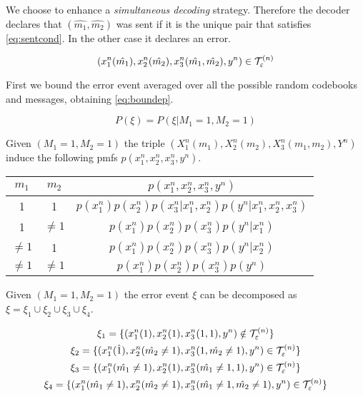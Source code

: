 We choose to enhance a \textit{simultaneous decoding} strategy. Therefore the decoder declares that $(\hat{m_1},\hat{m_2})$ was sent if it is the unique pair that satisfies \eqref{eq:sentcond}. In the other case it declares an error.

\begin{equation}
	(x_1^n(\hat{m_1}),x_2^n(\hat{m_2}), x_3^n(\hat{m_1}, \hat{m_2}), y^n) \in \mathcal{T}_\varepsilon^{(n)}{}
	\label{eq:sentcond}
\end{equation}

First we bound the error event averaged over all the possible random codebooks and messages, obtaining \eqref{eq:boundep}.

\begin{equation}
	P(\xi)=P(\xi | M_1=1,M_2=1)
	\label{eq:boundep}
\end{equation}

Given $(M_1=1,M_2=1)$ the triple $(X_1^n(m_1),X_2^n(m_2), X_3^n(m_1,m_2),Y^n)$ induce the following pmfs $p(x_1^n,x_2^n,x_3^n,y^n)$.

\begin{center}
    \begin{tabular}{ | c | c | c |}
    \hline
		$m_1$ & $m_2$ & $p(x_1^n,x_2^n,x_3^n,y^n)$ \\ \hline
		1 & 1 & $p(x_1^n)p(x_2^n)p(x_3^n|x_1^n,x_2^n)p(y^n|x_1^n,x_2^n,x_3^n)$ \\ \hline
    1 & $\neq 1$ & $p(x_1^n)p(x_2^n)p(x_3^n)p(y^n|x_1^n)$ \\ \hline
    $\neq 1$ & 1 & $p(x_1^n)p(x_2^n)p(x_3^n)p(y^n|x_2^n)$ \\ \hline
		$\neq 1$ & $\neq 1$ & $p(x_1^n)p(x_2^n)p(x_3^n)p(y^n)$ \\ \hline
    \end{tabular}
\end{center}

Given $(M_1=1,M_2=1)$ the error event $\xi$ can be decomposed as $\xi = \xi_1 \cup \xi_2 \cup \xi_3 \cup \xi_4$.

\begin{equation}
	\begin{gathered}
		\xi_1 = \{ (x_1^n(1),x_2^n(1), x_3^n(1,1), y^n) \notin \mathcal{T}_\varepsilon^{(n)}{} \} \\
		\xi_2 = \{ (x_1^n(\hat{1}),x_2^n(\hat{m_2} \neq 1), x_3^n(1,\hat{m_2} \neq 1), y^n) \in \mathcal{T}_\varepsilon^{(n)}{} \} \\
		\xi_3 = \{ (x_1^n(\hat{m_1}\neq 1),x_2^n(1), x_3^n(\hat{m_1} \neq 1,1), y^n) \in \mathcal{T}_\varepsilon^{(n)}{} \} \\
		\xi_4 = \{ (x_1^n(\hat{m_1}\neq 1),x_2^n(\hat{m_2} \neq 1), x_3^n(\hat{m_1} \neq 1,\hat{m_2} \neq 1), y^n) \in \mathcal{T}_\varepsilon^{(n)}{} \} \\
	\end{gathered}
\end{equation}

